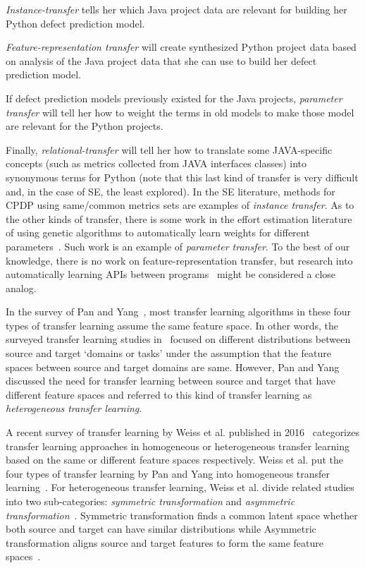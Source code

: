 \squishlist
\item
{\em Instance-transfer} tells her which Java project data are relevant
for building her Python defect prediction model.
\item
{\em Feature-representation transfer} will create synthesized Python
project data based on analysis of the Java project data that she can
use to build her defect prediction model.  
\item
If defect prediction models previously existed for the Java projects,
{\em parameter transfer} will tell her how to weight the terms in old
models to make those model are relevant for the Python projects.
\item
Finally, {\em relational-transfer} will tell her how to translate some
JAVA-specific concepts (such as metrics collected from JAVA interfaces
classes) into synonymous terms for Python (note that this last kind
of transfer is very difficult and, in the case of SE, the least
explored).
\squishend
In the SE literature, methods for CPDP using same/common metrics sets are examples 
of {\em instance transfer}. As to the other kinds of transfer, there is some work in the effort estimation literature of using
genetic algorithms to automatically learn weights for different parameters~\cite{sigweni2014feature}. Such work is an example of {\em parameter transfer}.
To the best of our knowledge, there is no work on feature-representation transfer, but research into automatically
learning APIs between programs~\cite{dallmeier2012automatically} might be considered a close analog.

In the survey of Pan and Yang~\cite{Pan10}, most transfer learning algorithms in these four types of transfer learning assume the same feature space.
In other words, the surveyed transfer learning studies in~\cite{Pan10} focused on different distributions between source and target `domains or tasks'
under the assumption that the feature spaces between source and target domains are same. However, Pan and Yang discussed the need for transfer learning between source and target that have different feature spaces and referred to this kind of transfer learning as {\em heterogeneous transfer learning}.

A recent survey of transfer learning by Weiss et al. published in 2016~\cite{Weiss2016} categorizes transfer learning approaches in homogeneous or heterogeneous transfer learning based on the same or different feature spaces respectively. Weiss et al. put the four types of transfer learning by Pan and Yang into homogeneous transfer learning~\cite{Weiss2016}. For heterogeneous transfer learning, Weiss et al. divide related studies into two sub-categories: {\em symmetric transformation} and {\em asymmetric transformation}~\cite{Weiss2016}. Symmetric transformation finds a common latent space whether both source and target can have similar distributions while Asymmetric transformation aligns source and target features to form the same feature spaces~\cite{Weiss2016}.

